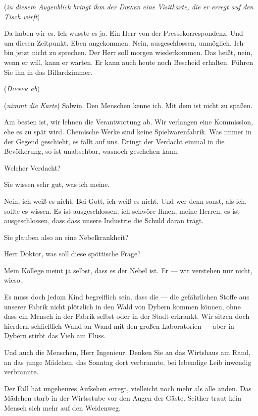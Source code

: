 \documentclass[
	final,
	a4paper,
	ngerman,
	mpinclude = true, %
	twoside = true,
	open = right,
	cleardoublepage = plain,
	DIV = 13,
	BCOR = 1cm,
	titlepage = firstiscover,
	]{scrbook}
\newcommand{\direction}[1]{(\textit{#1})}
\newcommand{\thecharacter}[1]{\textup{\textsc{#1}}\xspace}
\newcommand{\theAlexis}{\thecharacter{Alexis}}
\newcommand{\theThomsen}{\thecharacter{Thomsen}}
\newcommand{\theJonas}{\thecharacter{Jonas}}
\newcommand{\theDiener}{\thecharacter{Diener}}
\newcommand{\character}[1]{\item[#1]}
\newcommand{\Generaldirektor}{\character{Direktor}}
\newcommand{\Alexis}{\character{\theAlexis}}
\newcommand{\Thomsen}{\character{\theThomsen}}
\newcommand{\Jonas}{\character{\theJonas}}
\begin{document}
\begin{play}
\direction{in diesem Augenblick bringt ihm der \theDiener eine Visitkarte, die er erregt auf den Tisch wirft}

Da haben wir es. Ich wusste es ja. Ein Herr von der Pressekorrespondenz. Und um diesen Zeitpunkt. Eben angekommen. Nein, ausgeschlossen, unmöglich. Ich bin jetzt nicht zu sprechen. Der Herr soll morgen wiederkommen. Das heißt, nein, wenn er will, kann er warten. Er kann auch heute noch Bescheid erhalten. Führen Sie ihn in das Billardzimmer.

\direction{\theDiener ab}

\Alexis
\direction{nimmt die Karte} Salwin. Den Menschen kenne ich. Mit dem ist nicht zu spaßen.

\Generaldirektor
Am besten ist, wir lehnen die Verantwortung ab. Wir verlangen eine Kommission, ehe es zu spät wird. Chemische Werke sind keine Spielwarenfabrik. Was immer in der Gegend geschieht, es fällt auf uns. Dringt der Verdacht einmal in die Bevölkerung, so ist unabsehbar, wasnoch geschehen kann.

\Alexis
Welcher Verdacht?

\Generaldirektor
Sie wissen sehr gut, was ich meine.

\Alexis
Nein, ich weiß es nicht. Bei Gott, ich weiß es nicht. Und wer denn sonst, als ich, sollte es wissen. Es ist ausgeschlossen, ich schwöre Ihnen, meine Herren, es ist ausgeschlossen, dass dass unsere Industrie die Schuld daran trägt.

\Jonas
Sie glauben also an eine Nebelkrankheit?

\Alexis
Herr Doktor, was soll diese spöttische Frage?

\Thomsen
Mein Kollege meint ja selbst, dass es der Nebel ist. Er --- wir verstehen nur nicht, wieso.

\Alexis
Es muss doch jedom Kind begreiflich sein, dass die --- die gefährlichen Stoffe aus unserer Fabrik nicht plötzlich in den Wald von Dybern kommen können, ohne dass ein Mensch in der Fabrik selbst oder in der Stadt erkrankt. Wir sitzen doch hierdern schließlich Wand an Wand mit den großen Laboratorien --- aber in Dybern stirbt das Vieh am Fluss.

\Jonas
Und auch die Menschen, Herr Ingenieur. Denken Sie an das Wirtshaus am Rand, an das junge Mädchen, das Sonntag dort verbrannte, bei lebendige Leib inwendig verbrannte.

\Thomsen
Der Fall hat ungeheures Aufsehen erregt, vielleicht noch mehr als alle anden. Das Mädchen starb in der Wirtsstube vor den Augen der Gäste. Seither traut kein Mensch sich mehr auf den Weidenweg.


\end{play}
\end{document}
